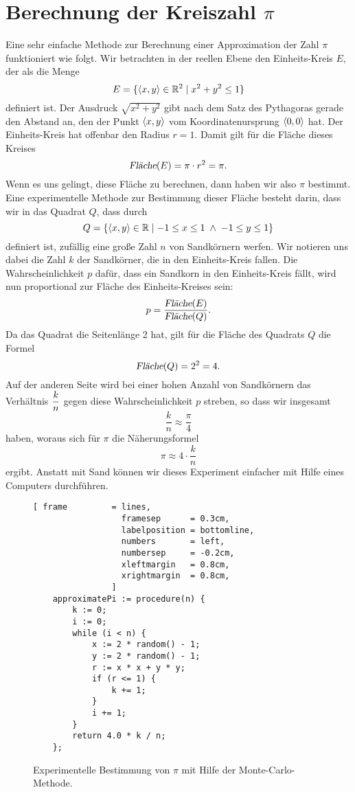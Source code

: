 \section[Computing $\pi$]{Berechnung der Kreiszahl $\pi$}
Eine sehr einfache Methode zur Berechnung einer Approximation der Zahl $\pi$ funktioniert wie folgt.
Wir betrachten in der reellen Ebene den Einheits-Kreis $E$, der als die Menge
\[ E = \{ \pair(x,y) \in \mathbb{R}^2 \mid x^2 + y^2 \leq 1 \} \]
definiert ist.  Der Ausdruck $\sqrt{x^2 + y^2}$ gibt nach dem Satz des Pythagoras gerade den Abstand an,
den der Punkt $\pair(x,y)$ vom Koordinatenursprung $\pair(0,0)$ hat.  Der Einheits-Kreis hat offenbar den
Radius $r = 1$.  Damit gilt f\"ur die Fl\"ache dieses Kreises
\[ \textsl{Fl\"ache}(E) = \pi \cdot r^2 = \pi. \]
Wenn es uns gelingt, diese Fl\"ache zu berechnen, dann haben wir also $\pi$ bestimmt.  Eine experimentelle
Methode zur Bestimmung dieser Fl\"ache besteht darin, dass wir in das Quadrat $Q$, dass durch
\[ Q = \{ \pair(x,y) \in \mathbb{R} \mid -1 \leq x \leq 1 \;\wedge\; -1 \leq y \leq 1 \} \]
definiert ist, zuf\"allig eine gro{\ss}e Zahl $n$ von Sandk\"ornern werfen.  Wir notieren uns dabei die Zahl $k$ 
der Sandk\"orner, die in den Einheits-Kreis fallen.  Die Wahrscheinlichkeit $p$ daf\"ur, dass ein Sandkorn in den
Einheits-Kreis f\"allt, wird nun proportional zur Fl\"ache des Einheits-Kreises sein:
\[ p = \frac{\textsl{Fl\"ache}(E)}{\textsl{Fl\"ache}(Q)}. \]
Da das Quadrat die Seitenl\"ange 2 hat, gilt f\"ur die Fl\"ache des Quadrats $Q$ die Formel
\[ \textsl{Fl\"ache}(Q) = 2^2 = 4. \]
Auf der anderen Seite wird bei einer hohen Anzahl von Sandk\"ornern das Verh\"altnis $\displaystyle\frac{k}{n}$ gegen diese
Wahrscheinlichkeit $p$ streben, so dass wir insgesamt
\[ \frac{k}{n} \approx \frac{\pi}{4} \]
haben, woraus sich f\"ur $\pi$ die N\"aherungsformel
\[ \pi \approx 4 \cdot \frac{k}{n} \]
ergibt.  Anstatt mit Sand  k\"onnen wir dieses Experiment einfacher mit Hilfe eines Computers durchf\"uhren.

\begin{figure}[!ht]
\centering
\begin{Verbatim}[ frame         = lines, 
                  framesep      = 0.3cm, 
                  labelposition = bottomline,
                  numbers       = left,
                  numbersep     = -0.2cm,
                  xleftmargin   = 0.8cm,
                  xrightmargin  = 0.8cm,
                ]
    approximatePi := procedure(n) {
        k := 0;  
        i := 0;
        while (i < n) {
            x := 2 * random() - 1;
            y := 2 * random() - 1;
            r := x * x + y * y;
            if (r <= 1) {
                k += 1;
            }
            i += 1;
        }
        return 4.0 * k / n;
    };
\end{Verbatim}
\vspace*{-0.3cm}
\caption{Experimentelle Bestimmung von $\pi$ mit Hilfe der Monte-Carlo-Methode.}
\label{fig:monte-carlo.stlx}
\end{figure}

